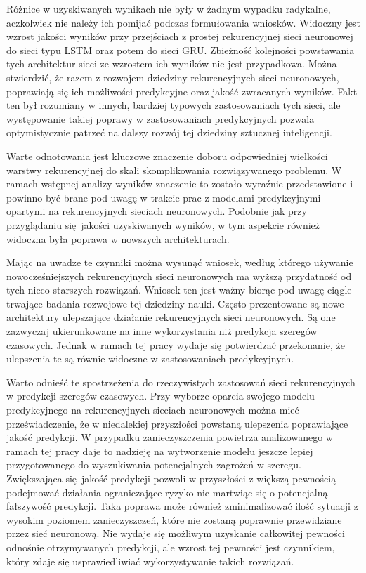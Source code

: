 \documentclass[10pt,a4paper]{article}
\begin{document}
Różnice w uzyskiwanych wynikach nie były w żadnym wypadku radykalne, aczkolwiek nie należy ich pomijać podczas formułowania wniosków. Widoczny jest wzrost jakości wyników przy przejściach z prostej rekurencyjnej sieci neuronowej do sieci typu LSTM oraz potem do sieci GRU. Zbieżność kolejności powstawania tych architektur sieci ze wzrostem ich wyników nie jest przypadkowa. Można stwierdzić, że razem z rozwojem dziedziny rekurencyjnych sieci neuronowych, poprawiają się ich możliwości predykcyjne oraz jakość zwracanych wyników. Fakt ten był rozumiany w innych, bardziej typowych zastosowaniach tych sieci, ale występowanie takiej poprawy w zastosowaniach predykcyjnych pozwala optymistycznie patrzeć na dalszy rozwój tej dziedziny sztucznej inteligencji. 

Warte odnotowania jest kluczowe znaczenie doboru odpowiedniej wielkości warstwy rekurencyjnej do skali skomplikowania rozwiązywanego problemu. W ramach wstępnej analizy wyników znaczenie to zostało wyraźnie przedstawione i powinno być brane pod uwagę w trakcie prac z modelami predykcyjnymi opartymi na rekurencyjnych sieciach neuronowych. Podobnie jak przy przyglądaniu się jakości uzyskiwanych wyników, w tym aspekcie również widoczna była poprawa w nowszych architekturach. 

Mając na uwadze te czynniki można wysunąć wniosek, według którego używanie nowocześniejszych rekurencyjnych sieci neuronowych ma wyższą przydatność od tych nieco starszych rozwiązań. Wniosek ten jest ważny biorąc pod uwagę ciągle trwające badania rozwojowe tej dziedziny nauki. Często prezentowane są nowe architektury ulepszające działanie rekurencyjnych sieci neuronowych. Są one zazwyczaj ukierunkowane na inne wykorzystania niż predykcja szeregów czasowych. Jednak w ramach tej pracy wydaje się potwierdzać przekonanie, że ulepszenia te są równie widoczne w zastosowaniach predykcyjnych. 

Warto odnieść te spostrzeżenia do rzeczywistych zastosowań sieci rekurencyjnych w predykcji szeregów czasowych. Przy wyborze oparcia swojego modelu predykcyjnego na rekurencyjnych sieciach neuronowych można mieć przeświadczenie, że w niedalekiej przyszłości powstaną ulepszenia poprawiające jakość predykcji. W przypadku zanieczyszczenia powietrza analizowanego w ramach tej pracy daje to nadzieję na wytworzenie modelu jeszcze lepiej przygotowanego do wyszukiwania potencjalnych zagrożeń w szeregu. Zwiększająca się jakość predykcji pozwoli w przyszłości z większą pewnością podejmować działania ograniczające ryzyko nie martwiąc się o potencjalną fałszywość predykcji. Taka poprawa może również zminimalizować ilość sytuacji z wysokim poziomem zanieczyszczeń, które nie zostaną poprawnie przewidziane przez sieć neuronową. Nie wydaje się możliwym uzyskanie całkowitej pewności odnośnie otrzymywanych predykcji, ale wzrost tej pewności jest czynnikiem, który zdaje się usprawiedliwiać wykorzystywanie takich rozwiązań. 
\end{document}
